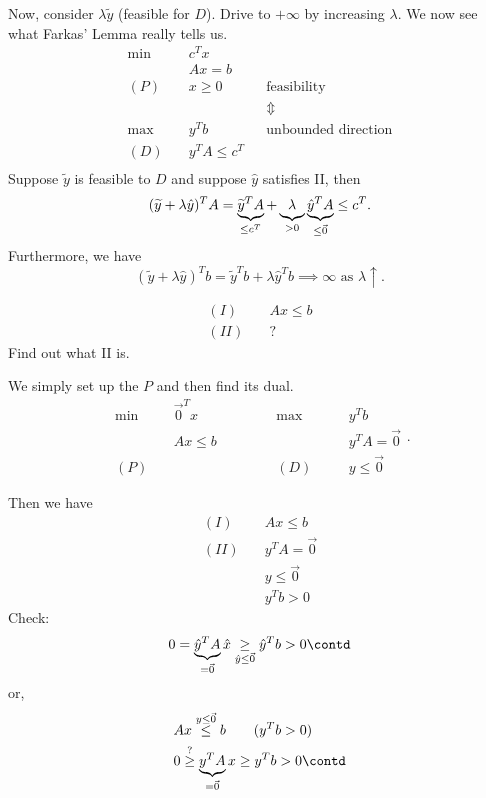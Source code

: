 \begin{remark}
	Now, consider \(\lambda \widetilde{y}\) (feasible for \(D\)). Drive to \(+\infty \) by increasing \(\lambda\). We now see what Farkas' Lemma really tells us.
	\begin{align*}
		\min~    & c^{T} x                                            \\
		         & Ax = b                                             \\
		(P)\quad & x\geq 0            &  & \text{feasibility}         \\
		         &                    &  & \Updownarrow               \\
		\max~    & y^{T}b             &  & \text{unbounded direction} \\
		(D)\quad & y^{T} A \leq c^{T}                                 \\
	\end{align*}
	Suppose \(\widetilde{y}\) is feasible to \(D\) and suppose \(\hat{y}\) satisfies II, then
	\[
		(\widetilde{y}+\lambda \hat{y})^{T} A = \underbrace{\widetilde{y}^{T}A}_{\leq c^{T}} + \underbrace{\vphantom{y}\lambda}_{>0} \underbrace{\hat{y}^{T} A}_{\leq \vec{0}} \leq c^{T}.
	\]
	Furthermore, we have
	\[
		(\widetilde{y}+\lambda \hat{y})^{T} b = \widetilde{y}^{T} b+\lambda \hat{y}^{T} b \implies \infty \text{ as } \lambda \uparrow  .
	\]
\end{remark}

\begin{eg}
	\begin{align*}
		(I)\quad  & Ax\leq b \\
		(II)\quad & ?
	\end{align*}
	Find out what II is.

	We simply set up the \(P\) and then find its dual.
	\[
		\begin{alignedat}{5}
			\min~&\vec{0}^{T} x\qquad\qquad	&&\max ~&&y^{T}b\\
			&Ax \leq b 			&&			&&y^{T} A =\vec{0}\\
			(P)\quad&			&&(D)\quad	&&y\leq \vec{0}
		\end{alignedat}.
	\]

	Then we have
	\begin{align*}
		(I)\quad  & Ax\leq b         \\
		(II)\quad & y^{T}A = \vec{0} \\
		          & y\leq \vec{0}    \\
		          & y^{T} b>0
	\end{align*}
	Check\(\colon\)
	\[
		0 = \underbrace{\hat{y}^{T} A}_{=\vec{0}} \hat{x} \underset{\hat{y} \leq \vec{0}}{\geq}  \hat{y}^{T} b>0 \contd
	\]
	or,
	\[
		\begin{split}
			&Ax \overset{y\leq \vec{0}}{\leq} b\qquad (y^{T}b>0)\\
			&0 \overset{?}{\geq} \underbrace{y^{T}A}_{ = \vec{0}} x\geq y^{T}b>0\contd
		\end{split}
	\]
\end{eg}

